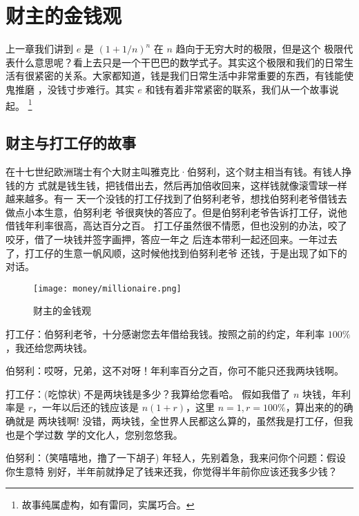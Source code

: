 %

\chapter{财主的金钱观}

上一章我们讲到 $e$ 是 $(1+ 1/n)^n$ 在 $n$ 趋向于无穷大时的极限，但是这个
极限代表什么意思呢？看上去只是一个干巴巴的数学式子。其实这个极限和我们的日常生
活有很紧密的关系。大家都知道，钱是我们日常生活中非常重要的东西，有钱能使鬼推磨
，没钱寸步难行。其实 $e$ 和钱有着非常紧密的联系，我们从一个故事说起。
\footnote{
故事纯属虚构，如有雷同，实属巧合。
}

\section{财主与打工仔的故事}
在十七世纪欧洲瑞士有个大财主叫雅克比·伯努利，这个财主相当有钱。有钱人挣钱的方
式就是钱生钱，把钱借出去，然后再加倍收回来，这样钱就像滚雪球一样越来越多。有一
天一个没钱的打工仔找到了伯努利老爷，想找伯努利老爷借钱去做点小本生意，伯努利老
爷很爽快的答应了。但是伯努利老爷告诉打工仔，说他借钱年利率很高，高达百分之百。
打工仔虽然很不情愿，但也没别的办法，咬了咬牙，借了一块钱并签字画押，答应一年之
后连本带利一起还回来。一年过去了，打工仔的生意一帆风顺，这时候他找到伯努利老爷
还钱，于是出现了如下的对话。

\begin{figure}[htbp]
\centering
\texttt{[image: money/millionaire.png]}
\caption{财主的金钱观}
\centering
\end{figure}

\noindent

打工仔：伯努利老爷，十分感谢您去年借给我钱。按照之前的约定，年利率 $100\%$，我还给您两块钱。 

伯努利：哎呀，兄弟，这不对呀！年利率百分之百，你可不能只还我两块钱啊。

打工仔：(吃惊状) 不是两块钱是多少？我算给您看哈。 假如我借了 $n$ 块钱，年利率是
$r$，一年以后还的钱应该是 $n(1 +r)$，这里 $n=1, r=100\%$，算出来的的确确就是
两块钱啊!  没错，两块钱，全世界人民都这么算的，虽然我是打工仔，但我也是个学过数
学的文化人，您别忽悠我。

伯努利：（笑嘻嘻地，撸了一下胡子) 年轻人，先别着急，我来问你个问题：假设你生意特
别好，半年前就挣足了钱来还我，你觉得半年前你应该还我多少钱？

